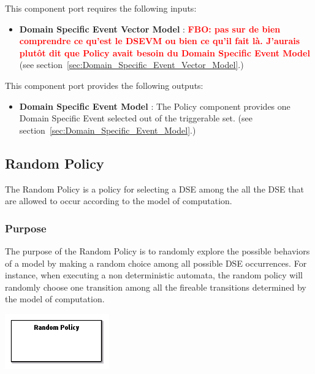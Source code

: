 \documentclass{gemoc} %
\begin{document}
This component port requires the following inputs:
\begin{itemize}
  \item \textbf{Domain Specific Event Vector Model} :
\textbf{\textcolor{red}{FBO: pas sur de bien comprendre ce qu'est le DSEVM ou bien ce qu'il fait l\`a. J'aurais plut\^ot dit que Policy avait besoin du Domain Specific Event Model}}
(see section~\ref{sec:Domain_Specific_Event_Vector_Model}.)
\end{itemize}

This component port provides the following outputs:
\begin{itemize}
  \item \textbf{Domain Specific Event Model} :
The Policy component provides one Domain Specific Event selected out of the triggerable set.
(see section~\ref{sec:Domain_Specific_Event_Model}.)
\end{itemize}


\subsection{Random Policy}
\label{sec:Random_Policy}
The Random Policy is a policy for selecting a DSE among the all the DSE that are allowed to occur according to the model of computation.

\subsubsection{Purpose}
The purpose of the Random Policy is to randomly explore the possible behaviors of a model by making a random choice among all possible DSE occurrences. For instance, when executing a non deterministic automata, the random policy will randomly choose one transition among all the fireable transitions determined by the model of computation.

\begin{center}
\includegraphics*[trim=0.0cm 0.0cm 0cm 0.0cm, clip=true]{../images/generated/Generated_Random_Policy.png}
\end{center}
\end{document}
